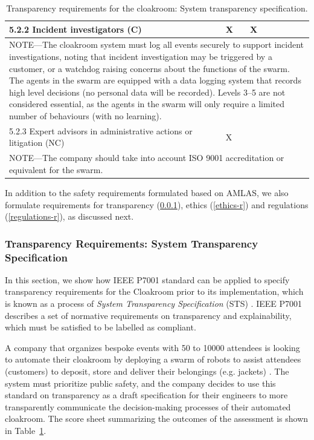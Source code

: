 \documentclass[lettersize,journal]{IEEEtran}
\begin{document}
\begin{table}
\begin{tabular}{|l| l| l| l| l| l|}
		5.2.2 Incident investigators (C) & X & X & & & \\ \hline
		\multicolumn{6}{|p{15cm}|}{NOTE—The cloakroom system must log all events securely to support incident investigations, noting that incident investigation may be triggered by a customer, or a watchdog raising concerns about the functions of the swarm. The agents in the swarm are equipped with a data logging system that records high level decisions (no personal data will be recorded). Levels 3--5 are not considered essential, as the agents in the swarm will only require a limited number of behaviours (with no learning).  }\\ \hline
		5.2.3 Expert advisors in administrative actions or litigation (NC) & X & & & & \\ \hline
		\multicolumn{6}{|p{15cm}|}{NOTE—The company should take into account ISO 9001 accreditation or equivalent for the swarm.}\\ \hline
	\end{tabular}
	\caption{\label{tab:transparency}Transparency requirements for the cloakroom: System transparency specification.}
\end{table}


In addition to the safety requirements formulated based on AMLAS, we also formulate requirements for transparency (\ref{transparency-r}), ethics (\ref{ethics-r}) and regulations (\ref{regulations-r}), as discussed next.\\

\subsubsection{Transparency Requirements: System Transparency Specification}\label{transparency-r}
In this section, we show how IEEE P7001 standard can be applied to specify transparency requirements for the Cloakroom prior to its implementation, which is known as a process of \textit{System Transparency Specification} (STS) \cite{IEEE-P7001}. IEEE P7001 describes a set of normative requirements on transparency and explainability, which must be satisfied to be labelled as compliant. %

A company that organizes bespoke events with 50 to 10000 attendees is looking to automate their cloakroom by deploying a swarm of robots to assist attendees (customers) to deposit, store and deliver their belongings (e.g. jackets) \cite{Jones2020}. %
The system must prioritize public safety, and the company decides to use this standard on transparency as a draft specification for their engineers to more transparently communicate the decision-making processes of their automated cloakroom. %
The score sheet summarizing the outcomes of the assessment is shown in Table~\ref{tab:transparency}. \\\\
\end{document}
